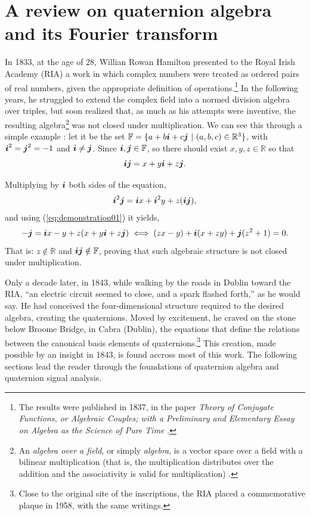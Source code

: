 \chapter{A review on quaternion algebra and its Fourier transform}
\label{ch:reviewQuat}

In 1833, at the age of 28, Willian Rowan Hamilton presented to the Royal Irish Academy (RIA) a work in which complex numbers were treated as ordered pairs of real numbers, given the appropriate definition of operations.\footnote{The results were published in 1837, in the paper \emph{Theory of Conjugate Functions, or Algebraic Couples; with a Preliminary and Elementary Essay on Algebra as the Science of Pure Time} \cite{hamilton1837theory}.} In the following years, he struggled to extend the complex field into a normed division algebra over triples, but soon realized that, as much as his attempts were inventive, the resulting algebra\footnote{An \textit{algebra over a field}, or simply \textit{algebra}, is a vector space over a field with a bilinear multiplication (that is, the multiplication distributes over the addition and the associativity is valid for multiplication) \cite{schafer1955introduction}.} was not closed under multiplication. We can see this through a simple example \cite{santos2011algebra}: let it be the set $\mathbb{F} = \{ a + b \boldsymbol{i} + c \boldsymbol{j}  \ | \ (a, b, c) \in \mathbb{R}^3\}$, with $\boldsymbol{i}^2 = \boldsymbol{j}^2 = -1$ and $\boldsymbol{i} \neq \boldsymbol{j}$. Since $\boldsymbol{i}, \boldsymbol{j} \in \mathbb{F}$, so there should exist $x, y, z \in \mathbb{R}$ so that
\begin{equation}
    \boldsymbol{i} \boldsymbol{j} = x + y \boldsymbol{i} + z \boldsymbol{j}.
    \label{eq:demonstration01}
\end{equation}

Multiplying by $\boldsymbol{i}$ both sides of the equation,
\begin{equation}
    \boldsymbol{i}^2 \boldsymbol{j} = \boldsymbol{i} x + \boldsymbol{i}^2 y + z (\boldsymbol{i} \boldsymbol{j}),
\end{equation}
and using (\ref{eq:demonstration01}) it yields,
\begin{equation}
    - \boldsymbol{j} = \boldsymbol{i} x - y + z (x + y \boldsymbol{i} + z \boldsymbol{j})
    \iff
    (zx - y) + \boldsymbol{i} (x + zy) + \boldsymbol{j} (z^2 + 1) = 0.
\end{equation}
That is: $z \notin \mathbb{R}$ and $ \boldsymbol{i} \boldsymbol{j} \notin \mathbb{F} $, proving that such algebraic structure is not closed under multiplication.

Only a decade later, in 1843, while walking by the roads in Dublin toward the RIA, ``an electric circuit seemed to close, and a spark flashed forth,'' as he would say. He had conceived the four-dimensional structure required to the desired algebra, creating the quaternions. Moved by excitement, he craved on the stone below Broome Bridge, in Cabra (Dublin), the equations that define the relations between the canonical basis elements of quaternions.\footnote{Close to the original site of the inscriptions, the RIA placed a commemorative plaque in 1958, with the same writings.} This creation, made possible by an insight in 1843, is found accross most of this work. The following sections lead the reader through the foundations of quaternion algebra and quaternion signal analysis.


